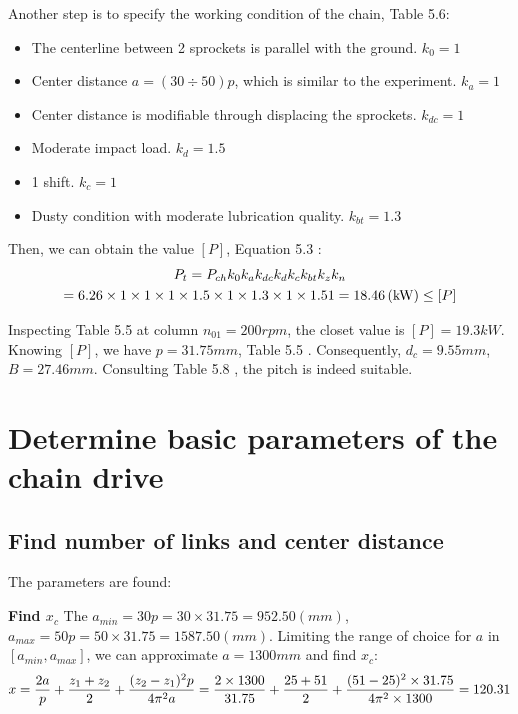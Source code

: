 Another step is to specify the working condition of the chain, Table 5.6:
\begin{itemize}
	\item The centerline between 2 sprockets is parallel with the ground. $ k_0 = 1 $
	\item Center distance $ a= (30\div 50)p $, which is similar to the experiment. $ k_a= 1 $
	\item Center distance is modifiable through displacing the sprockets. $ k_{dc}=1 $
	\item Moderate impact load. $ k_d=1.5 $
	\item 1 shift. $ k_c=1 $
	\item Dusty condition with moderate lubrication quality. $ k_{bt} =1.3$
\end{itemize}
Then, we can obtain the value $ [P] $, Equation 5.3 \cite{tk1}:
\begin{multline*}
	P_t=P_{ch}k_0k_ak_{dc}k_dk_ck_{bt}k_zk_n\\
	=6.26\times1\times1\times1\times1.5\times1\times1.3\times1\times1.51=18.46\, (\mathrm{kW})\leq[P]
\end{multline*}

Inspecting Table 5.5 \cite{tk1} at column $ n_{01}=200\unit{rpm} $, the closet value is $ [P]=19.3\unit{kW} $. Knowing $ [P] $, we have $ p= 31.75 \unit{mm} $, Table 5.5 \cite{tk1}. Consequently, $ d_c=9.55\unit{mm} $, $ B=27.46\unit{mm} $. Consulting Table 5.8 \cite{tk1}, the pitch is indeed suitable.

\section{Determine basic parameters of the chain drive}
\subsection{Find number of links and center distance}
The parameters are found:

\textbf{Find $ x_c $} The  $ a_{min} = 30p = 30\times 31.75= 952.50 \unit{(mm)} $, $ a_{max} = 50p = 50\times 31.75 = 1587.50 \unit{(mm)}$. Limiting the range of choice for $ a $ in $ [a_{min},a_{max}] $, we can approximate $ a = 1300 \unit{mm} $ and find $ x_c $:
\[x = \dfrac{2a}{p} + \dfrac{z_1+z_2}{2} + \dfrac{(z_2-z_1)^2p}{4\pi^2a}\\ = \dfrac{2\times 1300}{31.75} + \dfrac{25+51}{2} + \dfrac{(51-25)^2\times 31.75}{4\pi^2\times 1300}=120.31\]
%	

